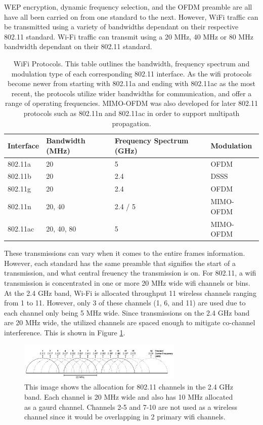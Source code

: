 WEP encryption, dynamic frequency selection, and the OFDM preamble are all have all been carried on from one standard to the next.  However, WiFi traffic can be transmitted using a variety of bandwidths dependant on their respective 802.11 standard.  Wi-Fi traffic can transmit using a 20 MHz, 40 MHz or 80 MHz bandwidth dependant on their 802.11 standard. 
\begin{table}[ht]
\centering
\caption{WiFi Protocols.  This table outlines the bandwidth, frequency spectrum and modulation type of each corresponding 802.11 interface. As the wifi protocols become newer from starting with 802.11a and ending with 802.11ac as the most recent, the protocols utilize wider bandwidths for communication, and offer a range of operating frequencies. MIMO-OFDM was also developed for later 802.11 protocols such as 802.11n and 802.11ac in order to support multipath propagation.}
\label{table:wifi_protocols}
\begin{tabular}{|l|l|l|l|}
  \hline
  Interface & Bandwidth (MHz) & Frequency Spectrum (GHz) & Modulation \\ \hline
          802.11a &              20 &                  5 &       OFDM \\
          802.11b &              20 &                2.4 &       DSSS \\
          802.11g &              20 &                2.4 &       OFDM \\
          802.11n &          20, 40 &            2.4 / 5 &  MIMO-OFDM \\
         802.11ac &      20, 40, 80 &                  5 &  MIMO-OFDM \\ \hline
\end{tabular}
\end{table}\par
These transmissions can vary when it comes to the entire frames information. However, each standard has the same preamble that signifies the start of a transmission, and what central freuency the transmission is on.  For 802.11, a wifi transmission is concentrated in one or more 20 MHz wide wifi channels or bins. At the 2.4 GHz band, Wi-Fi is allocated throughput 11 wireless channels ranging from 1 to 11.  However, only 3 of these channels (1, 6, and 11) are used due to each channel only being 5 MHz wide.  Since transmissions on the 2.4 GHz band are 20 MHz wide, the utilized channels are spaced enough to mitigate co-channel interference. This is shown in Figure \ref{fig:2.4GHz_channel}.
\begin{figure}[ht]
\centering
\includegraphics[width=0.70\textwidth]{img/2_GHz_Channels.png}
\caption{This image shows the allocation for 802.11 channels in the 2.4 GHz band. Each channel is 20 MHz wide and also has 10 MHz allocated as a gaurd channel. Channels 2-5 and 7-10 are not used as a wireless channel since it would be overlapping in 2 primary wifi channels.}
\label{fig:2.4GHz_channel}
\end{figure}
